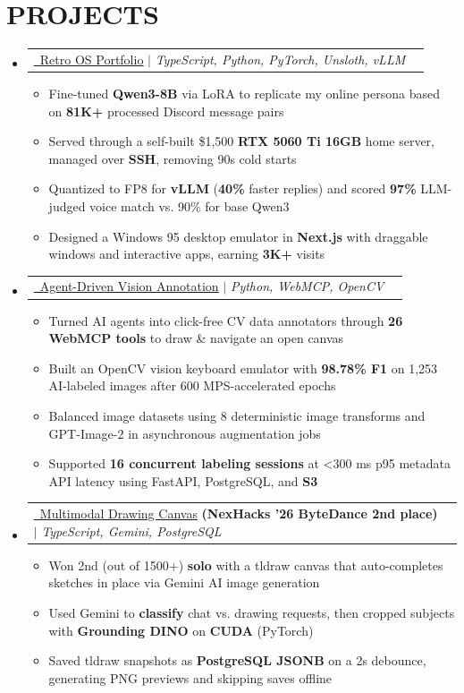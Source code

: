 \documentclass[letterpaper,11pt]{article}
\makeatletter
\newcommand{\resumeItem}[1]{
  \item\small{
    {#1 \vspace{-4pt}}
  }
}
\newcommand{\resumeProjectHeading}[2]{
    \item
    \begin{tabular*}{0.97\textwidth}[t]{l@{\extracolsep{\fill}}r}
      #1 & #2 \\
    \end{tabular*}\vspace{-7pt}
}
\newcommand{\resumeSubHeadingListStart}{\begin{itemize}[leftmargin=0.15in, label={}]}
\newcommand{\resumeSubHeadingListEnd}{\end{itemize}}
\newcommand{\resumeItemListStart}{\begin{itemize}[itemsep=4.5pt]}
\newcommand{\resumeItemListEnd}{\end{itemize}\vspace{-6pt}}
\newcommand{\vercelLogo}{\raisebox{0.02em}{\scalebox{1.43}[1.148]{$\blacktriangle$}}}
\makeatother
\begin{document}
\section{\textbf{PROJECTS}}
    \resumeSubHeadingListStart
    \resumeProjectHeading
  {\href{https://advm.dev/}{\textcolor{linkblue}{\underline{\vercelLogo\ Retro OS Portfolio}}}
  $|$
  \emph{TypeScript, Python, PyTorch, Unsloth, vLLM}
  }{}
  \resumeItemListStart
    \resumeItem{Fine-tuned \textbf{Qwen3-8B} via LoRA to replicate my online persona based on \textbf{81K+} processed Discord message pairs}
    \resumeItem{Served through a self-built \$1,500 \textbf{RTX 5060 Ti 16GB} home server, managed over \textbf{SSH}, removing 90s cold starts}
    \resumeItem{Quantized to FP8 for \textbf{vLLM} (\textbf{40\%} faster replies) and scored \textbf{97\%} LLM-judged voice match vs. 90\% for base Qwen3}
    \resumeItem{Designed a Windows 95 desktop emulator in \textbf{Next.js} with draggable windows and interactive apps, earning \textbf{3K+} visits}
  \resumeItemListEnd
    \resumeProjectHeading
  {\href{https://github.com/0xABAN/YADL}{\textcolor{linkblue}{\underline{\faGithub\ Agent-Driven Vision Annotation}}}
  $|$
  \emph{Python, WebMCP, OpenCV}
  }
  {}
  \resumeItemListStart
    \resumeItem{Turned AI agents into click-free CV data annotators through \textbf{26 WebMCP tools} to draw \& navigate an open canvas}
    \resumeItem{Built an OpenCV vision keyboard emulator with \textbf{98.78\% F1} on 1,253 AI-labeled images after 600 MPS-accelerated epochs}
    \resumeItem{Balanced image datasets using 8 deterministic image transforms and GPT-Image-2 in asynchronous augmentation jobs}
    \resumeItem{Supported \textbf{16 concurrent labeling sessions} at \textless{}300 ms p95 metadata API latency using FastAPI, PostgreSQL, and \textbf{S3}}
  \resumeItemListEnd
    \resumeProjectHeading
  {\href{https://github.com/AdamPSU/maestro}{\textcolor{linkblue}{\underline{\faGithub\ Multimodal Drawing Canvas}}} \textbf{(NexHacks '26 ByteDance 2nd place)}
  $|$
  \emph{TypeScript, Gemini, PostgreSQL}
  }
  {}
  \resumeItemListStart
    \resumeItem{Won 2nd (out of 1500+) \textbf{solo} with a tldraw canvas that auto-completes sketches in place via Gemini AI image generation}
    \resumeItem{Used Gemini to \textbf{classify} chat vs. drawing requests, then cropped subjects with \textbf{Grounding DINO} on \textbf{CUDA} (PyTorch)}
    \resumeItem{Saved tldraw snapshots as \textbf{PostgreSQL JSONB} on a 2s debounce, generating PNG previews and skipping saves offline}
  \resumeItemListEnd
    \resumeSubHeadingListEnd
\end{document}
